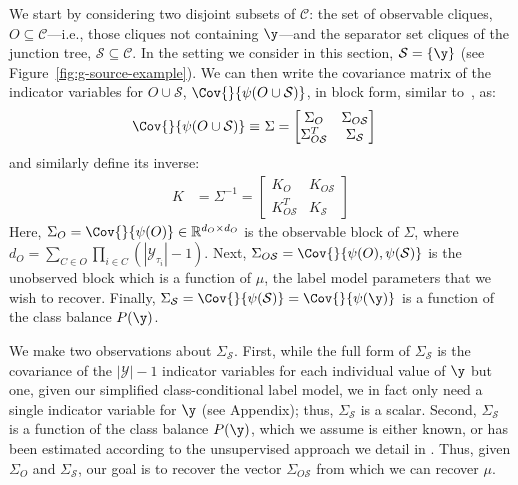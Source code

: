 \documentclass[letterpaper]{article}
\begin{document}
We start by considering two disjoint subsets of $\mathcal{C}$: the set of observable cliques, $O \subseteq \mathcal{C}$---i.e., those cliques not containing $\y$---and the separator set cliques of the junction tree, $\mathcal{S} \subseteq \mathcal{C}$. In the setting we consider in this section, $\mathcal{S} = \{\y\}$ (see Figure~\ref{fig:g-source-example}).
We can then write the covariance matrix of the indicator variables for $O \cup \mathcal{S}$, $\Cov{}{ \psi(O \cup \mathcal{S}) }$, in block form, similar to~\cite{chandrasekaran2010latent}, as:
\begin{align}
	\label{eqn:gen-cov}
	\Cov{}{ \psi(O \cup \mathcal{S}) }
	\equiv
	&~\Sigma
	=
	\begin{bmatrix}
		\Sigma_O & \Sigma_{O\mathcal{S}} \\
		\Sigma_{O\mathcal{S}}^T & \Sigma_\mathcal{S}
	\end{bmatrix}
\end{align}
and similarly define its inverse:
\begin{align}
	K
	&=
	\Sigma^{-1}
	=
	\begin{bmatrix}
		K_O & K_{O\mathcal{S}} \\
		K_{O\mathcal{S}}^T & K_\mathcal{S}
	\end{bmatrix}
\end{align}
Here, $\Sigma_O = \Cov{}{ \psi(O) } \in \mathbb{R}^{d_O \times d_O}$ is the observable block of $\Sigma$, where $d_O = \sum_{C \in O}\prod_{i \in C}(|\mathcal{Y}_{\tau_i}|-1)$.
Next, $\Sigma_{O\mathcal{S}} = \Cov{}{ \psi(O), \psi(\mathcal{S}) }$ is the unobserved block which is a function of $\mu$, the label model parameters that we wish to recover.
Finally, $\Sigma_\mathcal{S} = \Cov{}{ \psi(\mathcal{S}) } = \Cov{}{ \psi(\y) }$ is a function of the class balance $P(\y)$.

We make two observations about $\Sigma_\mathcal{S}$.
First, while the full form of $\Sigma_\mathcal{S}$ is the covariance of the $|\mathcal{Y}|-1$ indicator variables for each individual value of $\y$ but one, given our simplified class-conditional label model, we in fact only need a single indicator variable for $\y$ (see Appendix\versionswitch{}{ \ref{appendix:rank-one-reduction}}); thus, $\Sigma_\mathcal{S}$ is a scalar.
Second, $\Sigma_\mathcal{S}$ is a function of the class balance $P(\y)$, which we assume is either known, or has been estimated according to the unsupervised approach we detail in .
Thus, given $\Sigma_O$ and  $\Sigma_\mathcal{S}$, our goal is to recover the vector $\Sigma_{O\mathcal{S}}$ from which we can recover $\mu$.
	
\end{document}
